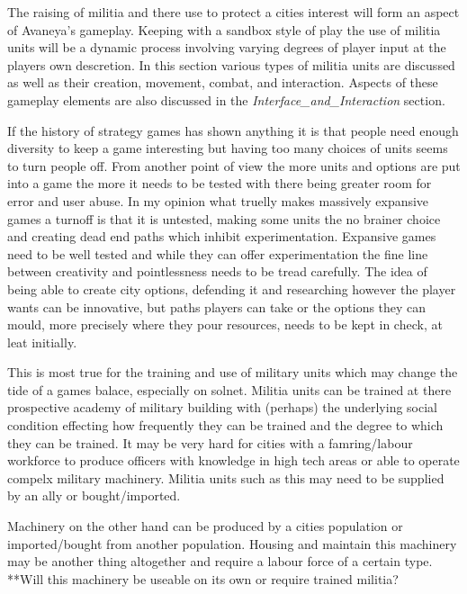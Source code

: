
The raising of militia and there use to protect a cities interest will form an aspect of Avaneya's gameplay. Keeping with a sandbox style of play the use of militia units will be a dynamic process involving varying degrees of player input at the players own descretion. In this section various types of militia units are discussed as well as their creation, movement, combat, and interaction. Aspects of these gameplay elements are also discussed in the {\it Interface_and_Interaction} section.

If the history of strategy games has shown anything it is that people need enough diversity to keep a game interesting but having too many choices of units seems to turn people off. From another point of view the more units and options are put into a game the more it needs to be tested with there being greater room for error and user abuse. In my opinion what truelly makes massively expansive games a turnoff is that it is untested, making some units the no brainer choice and creating dead end paths which inhibit experimentation. Expansive games need to be well tested and while they can offer experimentation the fine line between creativity and pointlessness needs to be tread carefully. The idea of being able to create city options, defending it and researching however the player wants can be innovative, but paths players can take or the options they can mould, more precisely where they pour resources, needs to be kept in check, at leat initially.

This is most true for the training and use of military units which may change the tide of a games balace, especially on solnet. Militia units can be trained at there prospective academy of military building with (perhaps) the underlying social condition effecting how frequently they can be trained and the degree to which they can be trained. It may be very hard for cities with a famring/labour workforce to produce officers with knowledge in high tech areas or able to operate compelx military machinery. Militia units such as this may need to be supplied by an ally or bought/imported.

Machinery on the other hand can be produced by a cities population or imported/bought from another population. Housing and maintain this machinery may be another thing altogether and require a labour force of a certain type. **Will this machinery be useable on its own or require trained militia?




